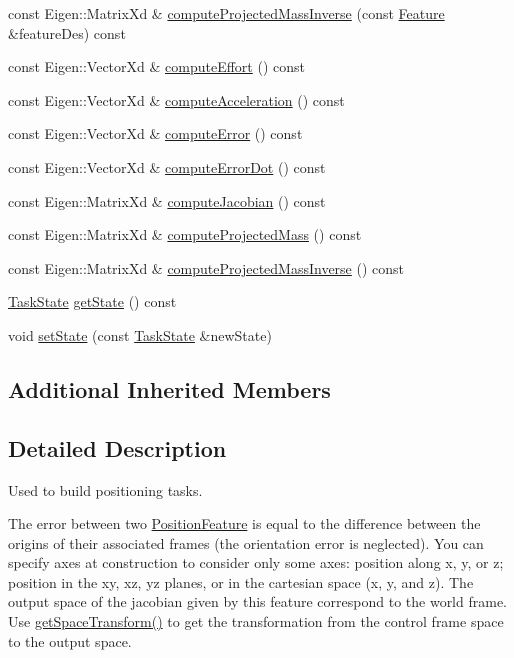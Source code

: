 \begin{DoxyCompactItemize}
\item 
const Eigen\+::\+Matrix\+Xd \& \hyperlink{classocra_1_1PositionFeature_a30163c57355643a81bd119cd23a46cc1}{compute\+Projected\+Mass\+Inverse} (const \hyperlink{classocra_1_1Feature}{Feature} \&feature\+Des) const
\item 
const Eigen\+::\+Vector\+Xd \& \hyperlink{classocra_1_1PositionFeature_a31fda0cc674bf08b067c12af39c5fbdd}{compute\+Effort} () const
\item 
const Eigen\+::\+Vector\+Xd \& \hyperlink{classocra_1_1PositionFeature_ad8cc562d88824f58ee21a1b1476edd4b}{compute\+Acceleration} () const
\item 
const Eigen\+::\+Vector\+Xd \& \hyperlink{classocra_1_1PositionFeature_a5f89935f4b2f1b420e1dec19ed6692b5}{compute\+Error} () const
\item 
const Eigen\+::\+Vector\+Xd \& \hyperlink{classocra_1_1PositionFeature_a3bf7b70beb60e5e2a4975a157f7b6c19}{compute\+Error\+Dot} () const
\item 
const Eigen\+::\+Matrix\+Xd \& \hyperlink{classocra_1_1PositionFeature_a15ec85661a0c18620f9214a375066cdd}{compute\+Jacobian} () const
\item 
const Eigen\+::\+Matrix\+Xd \& \hyperlink{classocra_1_1PositionFeature_aed6469ba39dae7d5ed76ee6f78ee8b5e}{compute\+Projected\+Mass} () const
\item 
const Eigen\+::\+Matrix\+Xd \& \hyperlink{classocra_1_1PositionFeature_a376ba3d167f5937ce97ccec0a27e2adf}{compute\+Projected\+Mass\+Inverse} () const
\item 
\hyperlink{classocra_1_1TaskState}{Task\+State} \hyperlink{classocra_1_1PositionFeature_a4727a1538487e8194789bc8d38807ea0}{get\+State} () const
\item 
void \hyperlink{classocra_1_1PositionFeature_a59ca48f39003aeba08dd8a6e8eec686c}{set\+State} (const \hyperlink{classocra_1_1TaskState}{Task\+State} \&new\+State)
\end{DoxyCompactItemize}
\subsection*{Additional Inherited Members}


\subsection{Detailed Description}
Used to build positioning tasks. 

The error between two \hyperlink{classocra_1_1PositionFeature}{Position\+Feature} is equal to the difference between the origins of their associated frames (the orientation error is neglected). You can specify axes at construction to consider only some axes\+: position along x, y, or z; position in the xy, xz, yz planes, or in the cartesian space (x, y, and z). The output space of the jacobian given by this feature correspond to the world frame. Use \hyperlink{classocra_1_1PositionFeature_a5ac98c0865a46c55d30fd7ab9738245c}{get\+Space\+Transform()} to get the transformation from the control frame space to the output space. 

